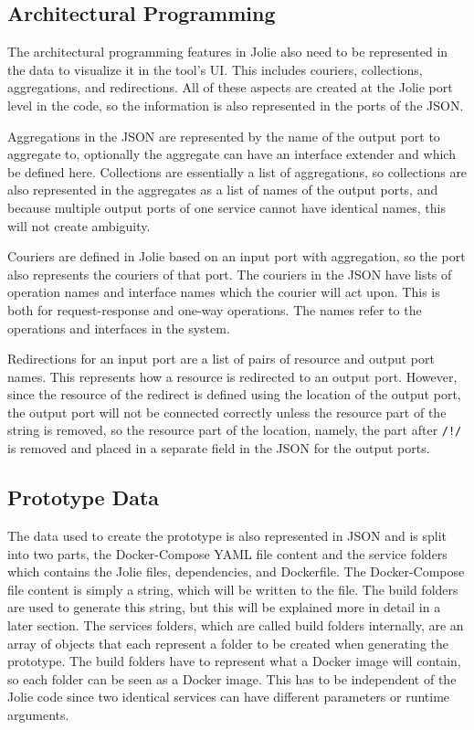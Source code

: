 \subsection{Architectural Programming}
The architectural programming features in Jolie also need to be represented in the data to visualize it in the tool's UI.
This includes couriers, collections, aggregations, and redirections. All of these aspects are created at the Jolie port level in the code, so the information is also represented in the ports of the JSON.

Aggregations in the JSON are represented by the name of the output port to aggregate to, optionally the aggregate can have an interface extender and which be defined here.
Collections are essentially a list of aggregations, so collections are also represented in the aggregates as a list of names of the output ports, and because multiple output ports of one service cannot have identical names, this will not create ambiguity.

Couriers are defined in Jolie based on an input port with aggregation, so the port also represents the couriers of that port.
The couriers in the JSON have lists of operation names and interface names which the courier will act upon. This is both for request-response and one-way operations. The names refer to the operations and interfaces in the system.

Redirections for an input port are a list of pairs of resource and output port names. This represents how a resource is redirected to an output port.
However, since the resource of the redirect is defined using the location of the output port, the output port will not be connected correctly unless the resource part of the string is removed, so the resource part of the location, namely,
the part after \texttt{/!/} is removed and placed in a separate field in the JSON for the output ports.

\subsection{Prototype Data}
The data used to create the prototype is also represented in JSON and is split into two parts, the Docker-Compose YAML file content and the service folders which contains the Jolie files, dependencies, and Dockerfile.
The Docker-Compose file content is simply a string, which will be written to the file. The build folders are used to generate this string, but this will be explained more in detail in a later section.
The services folders, which are called build folders internally, are an array of objects that each represent a folder to be created when generating the prototype.
The build folders have to represent what a Docker image will contain, so each folder can be seen as a Docker image. This has to be independent of the Jolie code since two identical services can have different parameters or runtime arguments.

